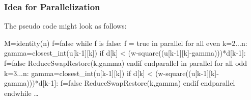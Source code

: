 \documentclass{beamer}
\begin{document}
\begin{frame}[fragile]
\frametitle{Idea for Parallelization}
The pseudo code might look as follows:
\begin{tiny}
\begin{semiverbatim}
M=identity(n)
f=false
while f is false:
\hspace{2em} f = true
\hspace{2em} in parallel for all even k=2...n:
\hspace{2em}\hspace{2em} gamma=closest_int(u[k-1][k])
\hspace{2em}\hspace{2em} if d[k] < (w-square((u[k-1][k]-gamma)))*d[k-1]:
\hspace{2em}\hspace{2em}\hspace{2em} f=false
\hspace{2em}\hspace{2em}\hspace{2em} ReduceSwapRestore(k,gamma)
\hspace{2em}\hspace{2em}endif
\hspace{2em} endparallel
\hspace{2em} in parallel for all odd k=3...n:
\hspace{2em}\hspace{2em} gamma=closest_int(u[k-1][k])
\hspace{2em}\hspace{2em} if d[k] < (w-square((u[k-1][k]-gamma)))*d[k-1]:
\hspace{2em}\hspace{2em}\hspace{2em} f=false
\hspace{2em}\hspace{2em}\hspace{2em} ReduceSwapRestore(k,gamma)
\hspace{2em}\hspace{2em}endif
\hspace{2em} endparallel
endwhile
\ldots
\end{semiverbatim}
\end{tiny}
\end{frame}
\end{document}
